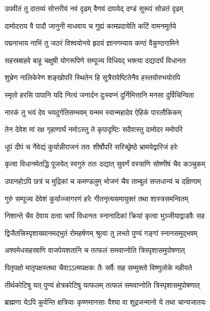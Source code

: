 \twolineshloka
{उपवीतं तु दातव्यं सोत्तरीयं नवं दृढम्}
{वैणवं दापयेद् दण्डं सुरूपं सोन्नतं दृढम्}%

\twolineshloka
{दामोदराय वै पादौ जानुनी माधवाय च}
{गुह्यं कामप्रदायेति कटिं वामनमूर्तये}%

\twolineshloka
{पद्मनाभाय नाभिं तु जठरं विश्वयोनये}
{हृदयं ज्ञानगम्याय कण्ठं वैकुण्ठगामिने}%

\twolineshloka
{सहस्रबाहवे बाहू चक्षुषी योगरूपिणे}
{सम्पूज्य विधिवद् भक्त्या दद्यादर्घं विधानतः}%

\twolineshloka
{शुभ्रेण नालिकेरेण शङ्खोपरि स्थितेन हि}
{सूत्रैरावेष्टितेनैव हस्तयोरुभयोरपि}%

\twolineshloka
{स्मृतो हरसि पापानि यदि नित्यं जनार्दन}
{दुःस्वप्नं दुर्निमित्तानि मनसा दुर्विचिन्विता}%

\twolineshloka
{नारकं तु भयं देव भयदुर्गतिसम्भवम्}
{यन्मम स्यान्महादेव ऐहिकं पारलौकिकम्}%

\twolineshloka
{तेन देवेश मां रक्ष गृहाणार्घं नमोऽस्तु ते}
{कृपादृष्टिः सदैवास्तु दामोदर ममोपरि}%

\twolineshloka
{धूपं दीपं च नैवेद्यं कुर्यान्नीराजनं ततः}
{शीर्षोपरि सरिच्छ्रेष्ठे भ्रामयेद्वारिजं हरेः}%

\twolineshloka
{कृत्वा विधानमेतद्धि पूजयेत् स्वगुरुं ततः}
{दद्यात् सुवर्णं वस्त्राणि सोष्णीषं चैव कञ्चुकम्}%

\twolineshloka
{उपानहोऽपि छत्रं च मुद्रिकां च कमण्डलुम्}
{भोजनं चैव ताम्बूलं सप्तधान्यं च दक्षिणाम्}%

\twolineshloka
{गुरुं सम्पूज्य देवेशं कुर्याज्जागरणं हरेः}
{गीतनृत्यसमायुक्तं तथा शास्त्रसमन्वितम्}%

\twolineshloka
{निशान्ते चैव देवाय दत्वा चार्घं विधानतः}
{स्नानादिकां क्रियां कृत्वा भुञ्जीयाद्वाडवैः सह}%


\twolineshloka
{द्विजैतत्त्रिस्पृशाख्यानमद्भुतं रोमहर्षणम्}
{श्रुत्वा तु लभते पुण्यं गङ्गां स्नानसमुद्भवम्}%

\twolineshloka
{अश्वमेधसहस्राणि वाजपेयशतानि च}
{तत्फलं समवाप्नोति त्रिस्पृशासमुपोषणात्}%

\twolineshloka
{पितृपक्षो मातृपक्षस्तथा चैवाऽऽत्मपक्षकः}
{तैः सर्वैः सह सम्मुक्तो विष्णुलोके महीयते}%

\twolineshloka
{तीर्थकोटिषु यत् पुण्यं क्षेत्रकोटिषु यत्फलम्}
{तत्फलं समवाप्नोति त्रिस्पृशासमुपोषणात्}%

\twolineshloka
{ब्राह्मणा येऽपि कुर्वन्ति क्षत्रियाः कृष्णमानसाः}
{वैश्या वा शूद्रजन्मानो ये तथा चान्यजातयः}%

